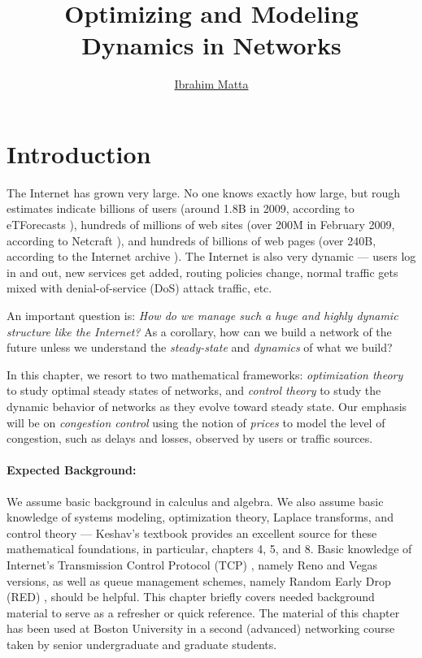 \documentclass{article}
\title{Optimizing and Modeling Dynamics in Networks}
\author{ \href{http://www.cs.bu.edu/~matta/}{Ibrahim Matta}}
\date{}							%
\begin{document}
\copyrightstatement

\pagestyle{empty}

\maketitle

\thispagestyle{empty}


\section{Introduction}

The Internet has grown very large. No one knows exactly how large, but rough estimates indicate billions of users (around 1.8B in 2009, according to eTForecasts \cite{eTForecasts}), hundreds of millions of web sites (over 200M in February 2009, according to Netcraft \cite{Netcraft}), and hundreds of billions of web pages (over 240B, according to the Internet archive \cite{Internet-archive}).
The Internet is also very dynamic --- users log in and out, new services get added, routing policies change, normal traffic gets mixed with denial-of-service (DoS) attack traffic, etc.

An important question is: {\em How do we manage such a huge and highly dynamic structure like the Internet?}
As a corollary, how can we build a network of the future unless we understand the {\em steady-state} and {\em dynamics} of what we build?

In this chapter, we resort to two mathematical frameworks: {\em optimization theory} to study optimal steady states of networks, and {\em control theory} to study the dynamic behavior of networks as they evolve toward steady state. Our emphasis will be on {\em congestion control} using the notion of {\em prices} to model the level of congestion, such as delays and losses, observed by users or traffic sources.

\paragraph{Expected Background:} We assume basic background in calculus and algebra.
We also assume basic knowledge of systems modeling, optimization theory, Laplace transforms, and control theory --- Keshav's textbook \cite{Keshav:2010} provides an excellent source for these mathematical foundations,
in particular, chapters 4, 5, and 8.
Basic knowledge of Internet's Transmission Control Protocol (TCP) \cite{tcp:1988},
namely Reno and Vegas \cite{vegas:1995} versions,
as well as queue management schemes, namely Random Early Drop (RED) \cite{red:1993},
should be helpful.
This chapter briefly covers needed background material to serve as a refresher or quick reference.
The material of this chapter has been used at Boston University in a second (advanced) networking course
taken by senior undergraduate and graduate students.
\end{document}

